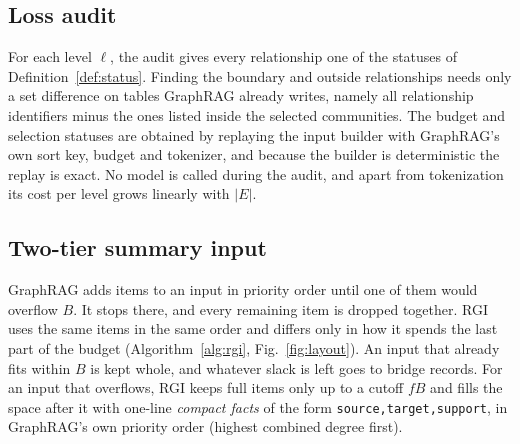 \documentclass[journal]{IEEEtran}
\theoremstyle{remark}
\begin{document}
\subsection{Loss audit}
For each level $\ell$, the audit gives every relationship one of the statuses of Definition~\ref{def:status}. Finding the boundary and outside relationships needs only a set difference on tables GraphRAG already writes, namely all relationship identifiers minus the ones listed inside the selected communities. The budget and selection statuses are obtained by replaying the input builder with GraphRAG's own sort key, budget and tokenizer, and because the builder is deterministic the replay is exact. No model is called during the audit, and apart from tokenization its cost per level grows linearly with $|E|$.

\subsection{Two-tier summary input}
GraphRAG adds items to an input in priority order until one of them would overflow $B$. It stops there, and every remaining item is dropped together. RGI uses the same items in the same order and differs only in how it spends the last part of the budget (Algorithm~\ref{alg:rgi}, Fig.~\ref{fig:layout}). An input that already fits within $B$ is kept whole, and whatever slack is left goes to bridge records. For an input that overflows, RGI keeps full items only up to a cutoff $fB$ and fills the space after it with one-line \emph{compact facts} of the form \texttt{source,target,support}, in GraphRAG's own priority order (highest combined degree first).
\end{document}
